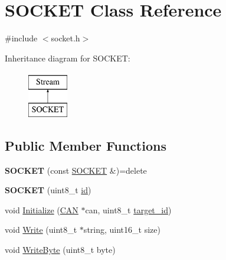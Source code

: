 \hypertarget{class_s_o_c_k_e_t}{\section{S\-O\-C\-K\-E\-T Class Reference}
\label{class_s_o_c_k_e_t}
}


{\ttfamily \#include $<$socket.\-h$>$}

Inheritance diagram for S\-O\-C\-K\-E\-T\-:\begin{figure}[H]
\begin{center}
\leavevmode
\includegraphics[height=2.000000cm]{class_s_o_c_k_e_t}
\end{center}
\end{figure}
\subsection*{Public Member Functions}
\begin{DoxyCompactItemize}
\item 
\hypertarget{class_s_o_c_k_e_t_a354625580716401ca8444fd01b99e89e}{{\bfseries S\-O\-C\-K\-E\-T} (const \hyperlink{class_s_o_c_k_e_t}{S\-O\-C\-K\-E\-T} \&)=delete}\label{class_s_o_c_k_e_t_a354625580716401ca8444fd01b99e89e}

\item 
\hypertarget{class_s_o_c_k_e_t_ab87e109918e43ba097c153114f4f6494}{{\bfseries S\-O\-C\-K\-E\-T} (uint8\-\_\-t \hyperlink{class_s_o_c_k_e_t_a0755fe74751c2d94d3d1679cad9e6544}{id})}\label{class_s_o_c_k_e_t_ab87e109918e43ba097c153114f4f6494}

\item 
void \hyperlink{class_s_o_c_k_e_t_a883fe771ed7afbc3373d1a7a8bb363ba}{Initialize} (\hyperlink{class_c_a_n}{C\-A\-N} $\ast$can, uint8\-\_\-t \hyperlink{class_s_o_c_k_e_t_a566ef7ae1ca5366f622bbe805954a031}{target\-\_\-id})
\item 
void \hyperlink{class_s_o_c_k_e_t_ad8ee6b81c9f30267406412a95264abed}{Write} (uint8\-\_\-t $\ast$string, uint16\-\_\-t size)
\item 
void \hyperlink{class_s_o_c_k_e_t_abcddb460b7adf3595a813f08f3659356}{Write\-Byte} (uint8\-\_\-t byte)
\end{DoxyCompactItemize}
